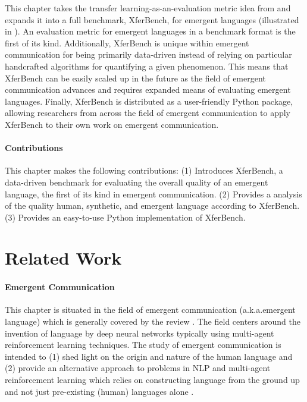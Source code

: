 This chapter takes the transfer learning-as-an-evaluation metric idea from \citet{yao2022linking} and expands it into a full benchmark, XferBench, for emergent languages (illustrated in ).
An evaluation metric for emergent languages in a benchmark format is the first of its kind.
Additionally, XferBench is unique within emergent communication for being primarily data-driven instead of relying on particular handcrafted algorithms for quantifying a given phenomenon.
This means that XferBench can be easily scaled up in the future as the field of emergent communication advances and requires expanded means of evaluating emergent languages.
Finally, XferBench is distributed as a user-friendly Python package, allowing researchers from across the field of emergent communication to apply XferBench to their own work on emergent communication.



\paragraph{Contributions}
This chapter makes the following contributions:
(1) Introduces XferBench, a data-driven benchmark for evaluating the overall quality of an emergent language, the first of its kind in emergent communication.
(2) Provides a analysis of the quality human, synthetic, and emergent language according to XferBench.
(3) Provides an easy-to-use Python implementation of XferBench.

\section{Related Work}


\paragraph{Emergent Communication}
This chapter is situated in the field of emergent communication (a.k.a.\@ emergent language) which is generally covered by the review \citet{lazaridou2020review}.
The field centers around the invention of language by deep neural networks typically using multi-agent reinforcement learning techniques.
The study of emergent communication is intended to (1) shed light on the origin and nature of the human language \citep{lacroix2019biology,MoulinFrier2020MultiAgentRL,Galke2022EmergentCF} and (2) provide an alternative approach to problems in NLP and multi-agent reinforcement learning which relies on constructing language from the ground up and not just pre-existing (human) languages alone \citep{li-etal-2020-emergent,yao2022linking,mu2023ec2,downey-etal-2023-learning}.

